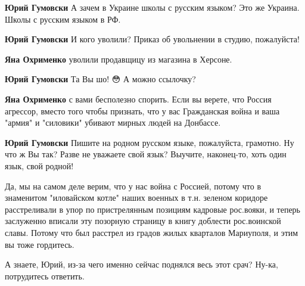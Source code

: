 \begin{itemize}
\begin{itemize}
\textbf{Юрий Гумовски} А зачем в Украине школы с русским языком? Это же Украина. Школы с русским языком в РФ.


\textbf{Юрий Гумовски} И кого уволили? Приказ об увольнении в студию, пожалуйста!


\textbf{Яна Охрименко} уволили продавщицу из магазина в Херсоне.


\textbf{Юрий Гумовски} Та Вы шо! 😳 А можно ссылочку?


\textbf{Яна Охрименко} с вами бесполезно спорить. Если вы верете, что Россия агрессор, вместо того чтобы признать, что у вас Гражданская война и ваша "армия" и "силовики" убивают мирных людей на Донбассе.


\textbf{Юрий Гумовски} Пишите на родном русском языке, пожалуйста, грамотно. Ну что ж Вы так? Разве не уважаете свой язык? Выучите, наконец-то, хоть один язык, свой родной!



Да, мы на самом деле верим, что у нас война с Россией, потому что в знаменитом
"иловайском котле" наших военных в т.н. зеленом коридоре расстреливали в упор
по пристрелянным позициям кадровые рос.вояки, и теперь заслуженно вписали эту
позорную страницу в книгу доблести рос.воинской славы. Потому что был расстрел
из градов жилых кварталов Мариуполя, и этим вы тоже гордитесь.


А знаете, Юрий, из-за чего именно сейчас поднялся весь этот срач? Ну-ка, потрудитесь ответить.


\end{itemize}
\end{itemize}
